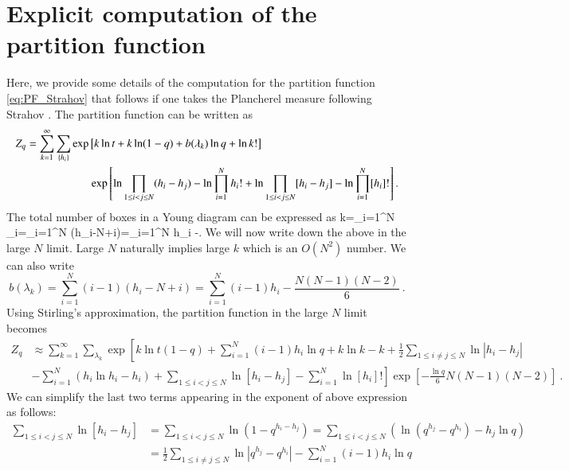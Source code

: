 \documentclass[3p,12pt]{elsarticle}
\numberwithin{equation}{section}
\begin{document}
\section{Explicit computation of the partition function}
\label{app:calculationofZ}
Here, we provide some details of the computation for the partition function \eqref{eq:PF_Strahov} that follows if one takes the \qd Plancherel measure following Strahov \cite{Strahov07}. The partition function can be written as
\begin{equation}
\begin{aligned}
Z_q
&=\sum_{k=1}^{\infty}\sum_{\{h_i\}} \exp\left[k\ln t+k \ln (1-q)+b(\lambda_k) \ln q +\ln k! \right] \\
&\hspace*{2cm} \exp \left[\ln \prod_{1 \leq i<j\leq N}(h_i-h_j)-\ln \prod_{i=1}^Nh_i! +\ln \prod_{1 \leq i<j\leq N}[h_i-h_j]-\ln \prod_{i=1}^N[h_i]! \right].
\end{aligned}
\end{equation}
The total number of boxes in a Young diagram can be expressed as 
\ben
k=\sum_{i=1}^N \lambda_i=\sum_{i=1}^N (h_i-N+i)=\sum_{i=1}^N h_i -.
\een
We will now write down the above in the large $N$ limit. Large $N$ naturally implies large $k$ which is an $O(N^2)$ number. We can also write
%
\begin{equation}
b(\lambda_k)=\sum_{i=1}^N (i-1)(h_i-N+i)=\sum_{i=1}^N (i-1)h_i-\frac{N(N-1)(N-2)}{6}\ .
\end{equation}
%
Using Stirling's approximation, the partition function in the large $N$ limit becomes
\begin{equation}
\begin{aligned}
Z_q &\approx \sum_{k=1}^{\infty}\sum_{\lambda_k} \exp \left[k\ln t(1-q) + \sum_{i=1}^N (i-1)h_i \ln q +k\ln k -k +\frac{1}{2} \sum_{1 \leq i\neq j\leq N} \ln |h_i-h_j|\right.\\
&\left. -\sum_{i=1}^N(h_i \ln h_i -h_i)+\sum_{1 \leq i<j\leq N} \ln [h_i-h_j] -\sum_{i=1}^N \ln [h_i]!\right]\exp\left[-\frac{\ln q}{6}N(N-1)(N-2)\right]\ .
\end{aligned}
\end{equation}
We can simplify the last two terms appearing in the exponent of above expression as follows:
\begin{equation}
\label{T3exprn}
\begin{aligned}
\sum_{1 \leq i<j\leq N} \ln [h_i-h_j]&=\sum_{1 \leq i<j\leq N} \ln (1-q^{h_i-h_j})=\sum_{1 \leq i<j\leq N} \left(\ln(q^{h_j}-q^{h_i}) -h_j \ln q\right)\\
&= \frac{1}{2} \sum_{1 \leq i\neq j\leq N}\ln |q^{h_j}-q^{h_i}|-\sum_{i=1}^N (i-1)h_i \ln q
\end{aligned}
\end{equation}
\end{document}
